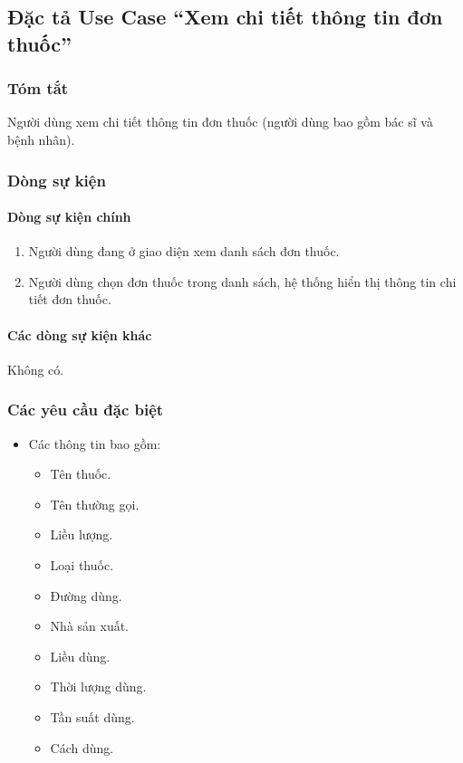 \subsection{Đặc tả Use Case ``Xem chi tiết thông tin đơn thuốc''}

\subsubsection{Tóm tắt}
Người dùng xem chi tiết thông tin đơn thuốc (người dùng bao gồm bác sĩ và bệnh nhân).

\subsubsection{Dòng sự kiện}
\paragraph{\textbf{Dòng sự kiện chính}}
\begin{enumerate}
  \item Người dùng đang ở giao diện xem danh sách đơn thuốc.
  \item Người dùng chọn đơn thuốc trong danh sách, hệ thống hiển thị thông tin chi tiết đơn thuốc.
\end{enumerate}

\paragraph{\textbf{Các dòng sự kiện khác}}
Không có.

\subsubsection{Các yêu cầu đặc biệt}
\begin{itemize}
  \item Các thông tin bao gồm:
    \begin{itemize}
      \item Tên thuốc.
      \item Tên thường gọi.
      \item Liều lượng.
      \item Loại thuốc.
      \item Đường dùng.
      \item Nhà sản xuất.
      \item Liều dùng.
      \item Thời lượng dùng.
      \item Tần suất dùng.
      \item Cách dùng.
    \end{itemize}
\end{itemize}

